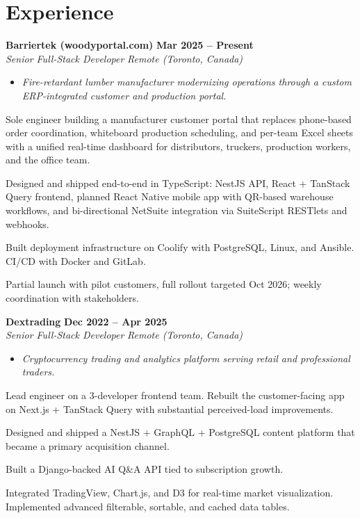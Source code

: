 \documentclass[letterpaper,10pt]{article}
\newcommand{\heading}[2]{
  \hspace{10pt}#1\hfill#2\\
}
\newcommand{\headingBf}[2]{
  \heading{\textbf{#1}}{\textbf{#2}}
}
\newcommand{\headingIt}[2]{
  \heading{\textit{#1}}{\textit{#2}}
}
\newenvironment{resume_list}{
  \vspace{-7pt}
  \begin{itemize}[itemsep=-2px, parsep=1pt, leftmargin=30pt]
}{
  \end{itemize}
  \vspace{1pt}
}
\newcommand{\companyDescription}[1]{
  \vspace{-7pt}
  \begin{itemize}[itemsep=-2px, parsep=1pt, leftmargin=12pt]
    \item[] {\color{textMuted}\textit{#1}}
  \end{itemize}
  \vspace{-4pt}
}
\begin{document}
  \section{Experience}

  \headingBf{ Barriertek (woodyportal.com) }{ Mar 2025 -- Present }
  \headingIt{ Senior Full-Stack Developer }{ Remote (Toronto, Canada) }
  \companyDescription{ Fire-retardant lumber manufacturer modernizing operations through a custom ERP-integrated customer and production portal. }
  \begin{resume_list}
    \item Sole engineer building a manufacturer customer portal that replaces phone-based order coordination, whiteboard production scheduling, and per-team Excel sheets with a unified real-time dashboard for distributors, truckers, production workers, and the office team.
    \item Designed and shipped end-to-end in TypeScript: NestJS API, React + TanStack Query frontend, planned React Native mobile app with QR-based warehouse workflows, and bi-directional NetSuite integration via SuiteScript RESTlets and webhooks.
    \item Built deployment infrastructure on Coolify with PostgreSQL, Linux, and Ansible. CI/CD with Docker and GitLab.
    \item Partial launch with pilot customers, full rollout targeted Oct 2026; weekly coordination with stakeholders.
  \end{resume_list}

  \headingBf{ Dextrading }{ Dec 2022 -- Apr 2025 }
  \headingIt{ Senior Full-Stack Developer }{ Remote (Toronto, Canada) }
  \companyDescription{ Cryptocurrency trading and analytics platform serving retail and professional traders. }
  \begin{resume_list}
    \item Lead engineer on a 3-developer frontend team. Rebuilt the customer-facing app on Next.js + TanStack Query with substantial perceived-load improvements.
    \item Designed and shipped a NestJS + GraphQL + PostgreSQL content platform that became a primary acquisition channel.
    \item Built a Django-backed AI Q\&A API tied to subscription growth.
    \item Integrated TradingView, Chart.js, and D3 for real-time market visualization. Implemented advanced filterable, sortable, and cached data tables.
  \end{resume_list}
\end{document}
